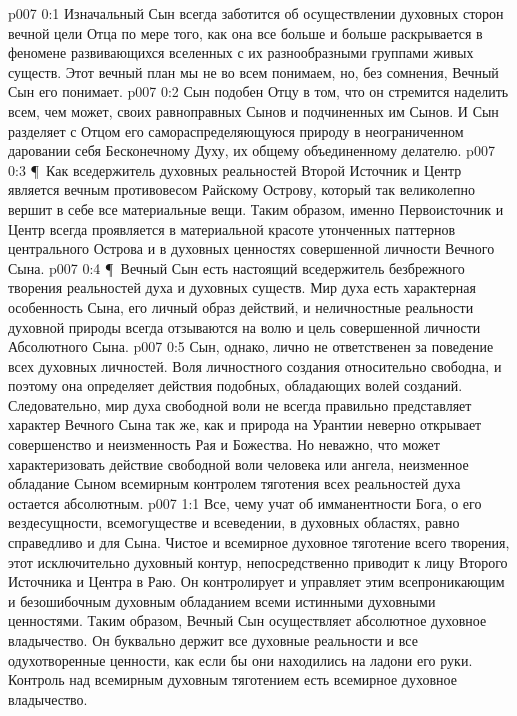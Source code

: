 \vs p007 0:1 Изначальный Сын всегда заботится об осуществлении духовных сторон вечной цели Отца по мере того, как она все больше и больше раскрывается в феномене развивающихся вселенных с их разнообразными группами живых существ. Этот вечный план мы не во всем понимаем, но, без сомнения, Вечный Сын его понимает.
\vs p007 0:2 Сын подобен Отцу в том, что он стремится наделить всем, чем может, своих равноправных Сынов и подчиненных им Сынов. И Сын разделяет с Отцом его самораспределяющуюся природу в неограниченном даровании себя Бесконечному Духу, их общему объединенному делателю.
\vs p007 0:3 \P\ Как вседержитель духовных реальностей Второй Источник и Центр является вечным противовесом Райскому Острову, который так великолепно вершит в себе все материальные вещи. Таким образом, именно Первоисточник и Центр всегда проявляется в материальной красоте утонченных паттернов центрального Острова и в духовных ценностях совершенной личности Вечного Сына.
\vs p007 0:4 \P\ Вечный Сын есть настоящий вседержитель безбрежного творения реальностей духа и духовных существ. Мир духа есть характерная особенность Сына, его личный образ действий, и неличностные реальности духовной природы всегда отзываются на волю и цель совершенной личности Абсолютного Сына.
\vs p007 0:5 Сын, однако, лично не ответственен за поведение всех духовных личностей. Воля личностного создания относительно свободна, и поэтому она определяет действия подобных, обладающих волей созданий. Следовательно, мир духа свободной воли не всегда правильно представляет характер Вечного Сына так же, как и природа на Урантии неверно открывает совершенство и неизменность Рая и Божества. Но неважно, что может характеризовать действие свободной воли человека или ангела, неизменное обладание Сыном всемирным контролем тяготения всех реальностей духа остается абсолютным.
\vs p007 1:1 Все, чему учат об имманентности Бога, о его вездесущности, всемогуществе и всеведении, в духовных областях, равно справедливо и для Сына. Чистое и всемирное духовное тяготение всего творения, этот исключительно духовный контур, непосредственно приводит к лицу Второго Источника и Центра в Раю. Он контролирует и управляет этим всепроникающим и безошибочным духовным обладанием всеми истинными духовными ценностями. Таким образом, Вечный Сын осуществляет абсолютное духовное владычество. Он буквально держит все духовные реальности и все одухотворенные ценности, как если бы они находились на ладони его руки. Контроль над всемирным духовным тяготением есть всемирное духовное владычество.
